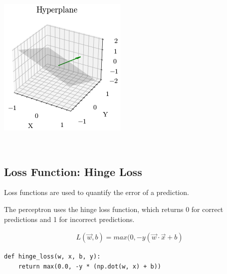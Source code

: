 \documentclass[openany]{book}
\begin{document}
    \begin{center}
    \includegraphics[width=\textwidth]{combined_files/combined_103_1.png}
    \end{center}
    { \hspace*{\fill} \\}
    
    \subsection{Loss Function: Hinge Loss}\label{loss-function-hinge-loss}

Loss functions are used to quantify the error of a prediction.

The perceptron uses the hinge loss function, which returns 0 for correct
predictions and 1 for incorrect predictions.

\begin{align*}
L(\vec{w}, b) = max(0, -y(\vec{w} \cdot \vec{x} + b)
\end{align*}

\begin{tcolorbox}
\tiny
\begin{verbatim}
def hinge_loss(w, x, b, y):
    return max(0.0, -y * (np.dot(w, x) + b))
\end{verbatim}
\end{tcolorbox}
\end{document}
